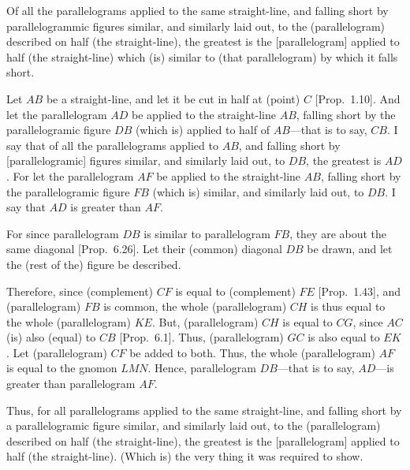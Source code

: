 \begin{Parallel}{}{}
{Of all the parallelograms applied to the
same straight-line, and falling short by parallelogrammic figures
similar, and similarly laid out, to the (parallelogram)
described on half (the straight-line), the greatest is the [parallelogram]
applied to half (the straight-line) which (is) similar to (that parallelogram)
by which it falls short.

Let $AB$ be a straight-line, and let it be cut in half at
(point) $C$ [Prop.~1.10]. And let the parallelogram $AD$ be applied to the straight-line
$AB$, 
falling short by the parallelogramic figure $DB$ (which is) applied to
half of $AB$---that is to say, $CB$. I say that of all  the parallelograms applied to $AB$, and
falling short by  [parallelogramic] figures similar, and similarly
laid out, to $DB$, the greatest is $AD$. For let the parallelogram
$AF$ be applied to the straight-line $AB$, falling short by
the parallelogramic figure $FB$ (which is) similar, and similarly laid out,
to $DB$. I say that $AD$ is greater than $AF$.

\epsfysize=2in
\centerline{}

For since parallelogram $DB$ is similar to parallelogram $FB$, they are
about the same diagonal [Prop.~6.26].
Let their (common) diagonal $DB$ be drawn, and let the (rest of the)  figure be
described.

Therefore, since (complement) $CF$ is equal to (complement) $FE$  [Prop.~1.43],
and (parallelogram) $FB$ is common, the whole (parallelogram) $CH$ is thus
equal to the whole (parallelogram) $KE$. But, (parallelogram)
$CH$ is equal to $CG$, since $AC$ (is) also (equal) to $CB$ [Prop.~6.1]. Thus, (parallelogram) $GC$ is also equal to $EK$. 
Let (parallelogram) $CF$ be added to both. Thus, the whole (parallelogram) $AF$
is equal to the gnomon $LMN$. Hence, parallelogram $DB$---that is
to say, $AD$---is greater than parallelogram $AF$.

Thus, for all parallelograms applied to the
same straight-line, and falling short by a parallelogramic figure
similar, and similarly laid out, to the (parallelogram)
described on half (the straight-line), the greatest is the [parallelogram]
applied to half (the straight-line). (Which is) the very thing it was required
to show.}
\end{Parallel}

